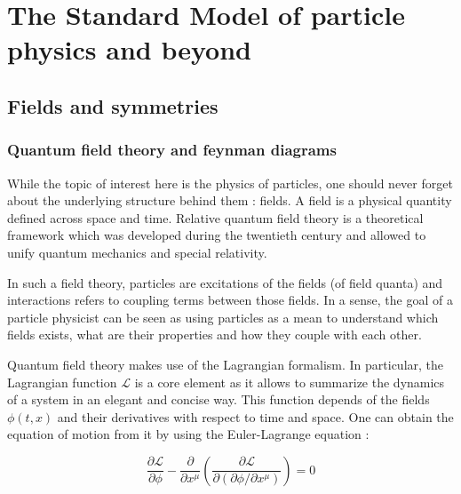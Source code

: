 


\tableofcontents

\newpage


\chapter{The Standard Model of particle physics and beyond}

    \section{Fields and symmetries}

        \subsection{Quantum field theory and feynman diagrams}


	While the topic of interest here is the physics of particles, one should 
    never forget about the underlying structure behind them : fields. A field 
    is a physical quantity defined across space and time. Relative quantum 
    field theory is a theoretical framework which was developed during the 
    twentieth century and allowed to unify quantum mechanics and special 
    relativity.

	In such a field theory, particles are excitations of the fields (of field 
    quanta) and interactions refers to coupling terms between those fields. 
    In a sense, the goal of a particle physicist can be seen as using particles
    as a mean to understand which fields exists, what are their properties and
    how they couple with each other.

    Quantum field theory makes use of the Lagrangian formalism. In particular, 
    the Lagrangian function $\mathcal{L}$ is a core element as it allows to 
    summarize the dynamics of a system in an elegant and concise way. This 
    function depends of the fields $\phi(t,x)$ and their derivatives with 
    respect to time and space. One can obtain the equation of motion from it 
    by using the Euler-Lagrange equation :

    $$
        \frac{\partial \mathcal{L}}{\partial \phi} 
        - 
        \frac{\partial}{\partial x^\mu} 
        \left( 
            \frac{\partial \mathcal{L}}{\partial (\partial \phi / \partial x^\mu)} 
        \right) 
        = 
        0
    $$

